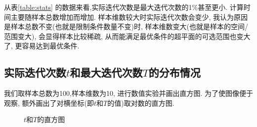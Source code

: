\documentclass[a4paper,12pt]{article}
\begin{document}
			从表\ref{table:stats} 的数据来看,实际迭代次数是最大迭代次数的1\%甚至更小.
			计算时间主要随样本总数增加而增加.
			样本维数较大时实际迭代次数会变少,
			我认为原因是样本总数不变(也就是限制条件数量不变)时,
			样本维数变大(也就是样本的空间/范围变大),
			会显得样本比较稀疏,
			从而能满足最优条件的超平面的可选范围也变大了,
			更容易达到最优条件.
			
		\subsection{实际迭代次数$t$和最大迭代次数$T$的分布情况}
			我们取样本总数为100,样本维数为10,
			进行数值实验并画出直方图.
			为了使图像便于观察,
			额外画出了对横坐标(即$t$和$T$的值)取对数的直方图.

			\begin{figure}[htbp]
				\centering
				\caption{$t$和$T$的直方图}\label{fig:hist}
			\end{figure}
\end{document}
